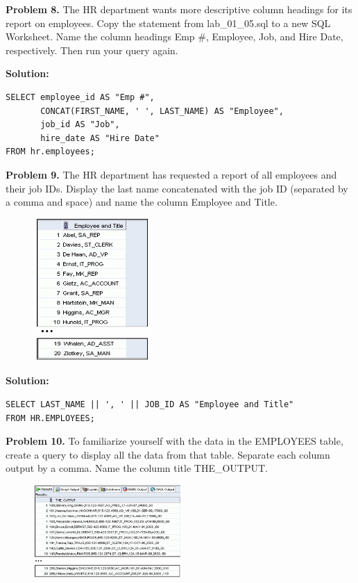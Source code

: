 \documentclass[12pt,a4paper]{article}
\begin{document}
\textbf{Problem 8.} The HR department wants more descriptive column headings for its report on employees. Copy the statement from lab\_01\_05.sql to a new SQL Worksheet. Name the column headings Emp \#, Employee, Job, and Hire Date, respectively. Then run your query again.

\textbf{Solution:}
\begin{lstlisting}[style=sqlstyle]
SELECT employee_id AS "Emp #", 
       CONCAT(FIRST_NAME, ' ', LAST_NAME) AS "Employee", 
       job_id AS "Job", 
       hire_date AS "Hire Date" 
FROM hr.employees;
\end{lstlisting}

\vspace{0.5cm}

\textbf{Problem 9.} The HR department has requested a report of all employees and their job IDs. Display the last name concatenated with the job ID (separated by a comma and space) and name the column Employee and Title.

\begin{figure}[htbp]
  \centering
  \includegraphics[width=0.4\textwidth]{Screenshots/19.png}
\end{figure}


\textbf{Solution:}
\begin{lstlisting}[style=sqlstyle]
SELECT LAST_NAME || ', ' || JOB_ID AS "Employee and Title"
FROM HR.EMPLOYEES;
\end{lstlisting}

\vspace{0.5cm}

\textbf{Problem 10.} To familiarize yourself with the data in the EMPLOYEES table, create a query to display all the data from that table. Separate each column output by a comma. Name the column title THE\_OUTPUT.

\begin{figure}[htbp]
  \centering
  \includegraphics[width=0.5\textwidth]{Screenshots/110.png}
\end{figure}
\end{document}
